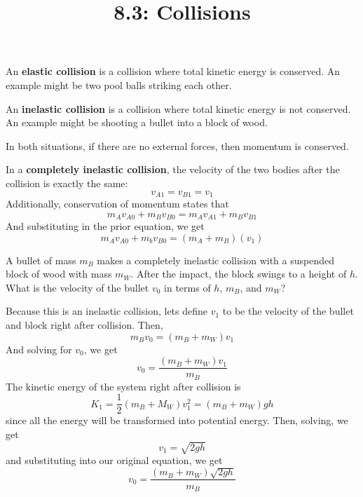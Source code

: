 \documentclass{article}
\title{8.3: Collisions}
\begin{document}
\maketitle
\begin{definition}
An \textbf{elastic collision} is a collision where total kinetic energy is conserved. An example might be two pool balls striking each other. 
\end{definition}

\begin{definition}
An \textbf{inelastic collision} is a collision where total kinetic energy is not conserved. An example might be shooting a bullet into a block of wood.
\end{definition}

In both situations, if there are no external forces, then momentum is conserved.

\begin{proposition}
In a \textbf{completely inelastic collision}, the velocity of the two bodies after the collision is exactly the same: $$v_{A1} = v_{B1} = v_1$$Additionally, conservation of momentum states that $$m_Av_{A0} + m_Bv_{B0} = m_Av_{A1} + m_Bv_{B1}$$And substituting in the prior equation, we get$$m_Av_{A0} + m_bv_{B0} = (m_A + m_B)(v_1)$$


\end{proposition}

\begin{example}
A bullet of mass $m_B$ makes a completely inelastic collision with a suspended block of wood with mass $m_W$. After the impact, the block swings to a height of $h$. What is the velocity of the bullet $v_0$ in terms of $h$, $m_B$, and $m_W$?
\end{example}

\begin{solution}
Because this is an inelastic collision, lets define $v_1$ to be the velocity of the bullet and block right after collision. Then, $$m_Bv_0 = (m_B + m_W)v_1$$And solving for $v_0$, we get $$v_0 = \frac{(m_B + m_W)v_1}{m_B}$$The kinetic energy of the system right after collision is $$K_1 = \frac{1}{2}(m_B + M_W)v_1^2 = (m_B + m_W)gh$$since all the energy will be transformed into potential energy. Then, solving, we get $$v_1 = \sqrt{2gh}$$and substituting into our original equation, we get $$v_0 = \frac{(m_B + m_W)\sqrt{2gh}}{m_B}$$
\end{solution}
\end{document}
